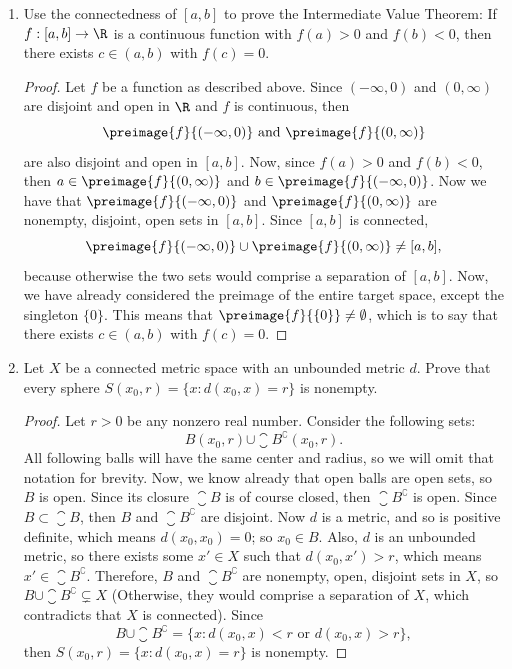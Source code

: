 \documentclass[letterpaper]{article}
\begin{document}
\begin{enumerate}
\item Use the connectedness of $[a,b]$ to prove the Intermediate Value Theorem: If $f:[a,b]\to\R$ is a continuous function with $f(a)>0$ and $f(b)<0$, then there exists $c\in(a,b)$ with $f(c)=0$. 
\begin{proof}
Let $f$ be a function as described above. Since $(-\infty,0)$ and $(0,\infty)$ are disjoint and open in $\R$ and $f$ is continuous, then 
$$\preimage{f}{(-\infty,0)} \text{ and } \preimage{f}{(0,\infty)}$$ 
are also disjoint and open in $[a,b]$. Now, since $f(a)>0$ and $f(b)<0$, then $a\in\preimage{f}{(0,\infty)}$ and $b\in\preimage{f}{(-\infty,0)}$. Now we have that $\preimage{f}{(-\infty,0)}$ and $\preimage{f}{(0,\infty)}$ are nonempty, disjoint, open sets in $[a,b]$. Since $[a,b]$ is connected, 
$$\preimage{f}{(-\infty,0)} \cup \preimage{f}{(0,\infty)} \neq [a,b],$$ 
because otherwise the two sets would comprise a separation of $[a,b]$. Now, we have already considered the preimage of the entire target space, except the singleton $\{0\}$. This means that $\preimage{f}{\{0\}}\neq\emptyset$, which is to say that there exists $c\in(a,b)$ with $f(c)=0$. 
\end{proof}

\item Let $X$ be a connected metric space with an unbounded metric $d$. Prove that every sphere $S(x_0,r)=\{x:d(x_0,x)=r\}$ is nonempty. 
\begin{proof}
Let $r>0$ be any nonzero real number. Consider the following sets:
$$B(x_0,r)\cup\closure{B}^\complement(x_0,r).$$
All following balls will have the same center and radius, so we will omit that notation for brevity. Now, we know already that open balls are open sets, so $B$ is open. Since its closure $\closure{B}$ is of course closed, then $\closure{B}^\complement$ is open. Since $B\subset\closure{B}$, then $B$ and $\closure{B}^\complement$ are disjoint. Now $d$ is a metric, and so is positive definite, which means $d(x_0,x_0)=0$; so $x_0\in B$. Also, $d$ is an unbounded metric, so there exists some $x'\in X$ such that $d(x_0,x')>r$, which means $x'\in\closure{B}^\complement$. Therefore, $B$ and $\closure{B}^\complement$ are nonempty, open, disjoint sets in $X$, so $B \cup \closure{B}^\complement \subsetneq X$ (Otherwise, they would comprise a separation of $X$, which contradicts that $X$ is connected). Since 
$$B \cup \closure{B}^\complement = \{x:d(x_0,x)<r \text{ or } d(x_0,x)>r \},$$
then $S(x_0,r)=\{x:d(x_0,x)=r\}$ is nonempty.
\end{proof}


\end{enumerate}
\end{document}
